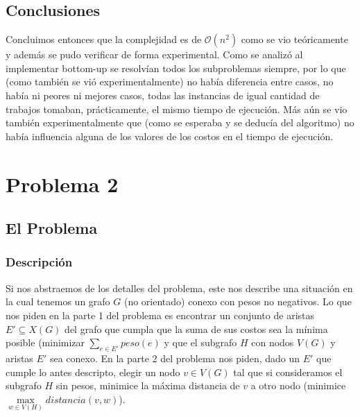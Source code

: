 \documentclass[A4paper,oneside,fleqn,11pt]{article}
\theoremstyle{definition}
\begin{document}
\subsection{Conclusiones}

Concluimos entonces que la complejidad es de $\mathcal{O}(n^2)$ como se vio teóricamente y además se pudo verificar de forma experimental. Como se analizó al implementar bottom-up se resolvían todos los subproblemas siempre, por lo que (como también se vió experimentalmente) no había diferencia entre casos, no había ni peores ni mejores casos, todas las instancias de igual cantidad de trabajos tomaban, prácticamente, el mismo tiempo de ejecución. Más aún se vio también experimentalmente que (como se esperaba y se deducía del algoritmo) no había influencia alguna de los valores de los costos en el tiempo de ejecución.

\section{Problema 2}
\subsection{El Problema}

\subsubsection{Descripción}
Si nos abstraemos de los detalles del problema, este nos describe una situación en la cual tenemos un grafo $G$ (no orientado) conexo con pesos no negativos. Lo que nos piden en la parte 1 del problema es encontrar un conjunto de aristas $E' \subseteq X(G)$ del grafo que cumpla que la suma de sus costos sea la mínima posible (minimizar $\sum\limits_{e \in E'} {peso(e)}$ y que el subgrafo $H$ con nodos $V(G)$ y aristas $E'$ sea conexo. En la parte 2
del problema nos piden, dado un $E'$ que cumple lo antes descripto, elegir un nodo $v \in V(G)$ tal que si consideramos el subgrafo $H$ sin pesos, minimice la máxima distancia de $v$ a otro nodo (minimice $\max\limits_{w\in V(H)}{distancia(v,w)}$).
\end{document}
